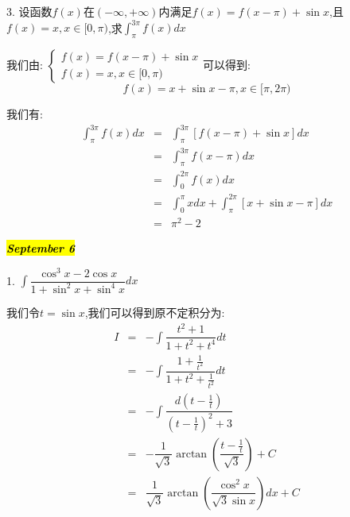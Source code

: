 3. 设函数$f(x)$在$(-\infty,+\infty)$内满足$f(x)=f(x-\pi)+\sin x$,且$f(x)=x,x\in[0,\pi)$,求$\int_{\pi}^{3\pi}f(x)dx$
\begin{solution}

	我们由:  $\left\lbrace
	\begin{array}{l}
		f(x)=f(x-\pi)+\sin x\\
		f(x)=x,x\in[0,\pi)
	\end{array}
	\right. $可以得到:  
	$$f(x)=x+\sin x-\pi,x\in[\pi,2\pi)$$
	
	我们有:  
	\begin{eqnarray*}
		\int_{\pi}^{3\pi}f(x)dx&=&\int_{\pi}^{3\pi}[f(x-\pi)+\sin x]dx\\
		&=&\int_{\pi}^{3\pi}f(x-\pi)dx\\
		&=&\int_{0}^{2\pi}f(x)dx\\
		&=&\int_{0}^{\pi}xdx+\int_{\pi}^{2\pi}[x+\sin x-\pi]dx\\
		&=&\pi^2-2
	\end{eqnarray*}
\end{solution}

\hl{\textbf{\textit{September 6}}}

1. $\int \dfrac{\cos^3 x-2\cos x}{1+\sin^2 x+\sin^4 x}dx$
\begin{solution}

	我们令$t=\sin x$,我们可以得到原不定积分为:  
	\begin{eqnarray*}
		I&=&-\int \dfrac{t^2+1}{1+t^2+t^4}dt\\
		&=&-\int \dfrac{1+\frac{1}{t^2}}{1+t^2+\frac{1}{t^2}}dt\\
		&=&-\int \dfrac{d(t-\frac{1}{t})}{(t-\frac{1}{t})^2+3}\\
		&=&-\dfrac{1}{\sqrt{3}}\arctan(\dfrac{t-\frac{1}{t}}{\sqrt{3}})+C\\
		&=&\dfrac{1}{\sqrt{3}}\arctan(\dfrac{\cos^2 x}{\sqrt{3}\sin x})dx+C
	\end{eqnarray*}
\end{solution}

